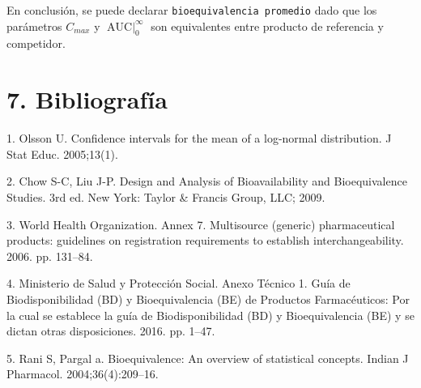 \documentclass[]{article}
\begin{document}
En conclusión, se puede declarar \texttt{bioequivalencia\ promedio} dado
que los parámetros \(C_{max}\) y \(\textrm{AUC}\mid_{0}^{\infty}\) son
equivalentes entre producto de referencia y competidor.

\section*{7. Bibliografía}\label{bibliografia}

\hypertarget{refs}{}
\hypertarget{ref-Olsson2005}{}
1. Olsson U. Confidence intervals for the mean of a log-normal
distribution. J Stat Educ. 2005;13(1).

\hypertarget{ref-Chow2009}{}
2. Chow S-C, Liu J-P. Design and Analysis of Bioavailability and
Bioequivalence Studies. 3rd ed. New York: Taylor \& Francis Group, LLC;
2009.

\hypertarget{ref-WorldHealthOrganization2006}{}
3. World Health Organization. Annex 7. Multisource (generic)
pharmaceutical products: guidelines on registration requirements to
establish interchangeability. 2006. pp. 131--84.

\hypertarget{ref-MinisteriodeSaludyProteccionSocial2016}{}
4. Ministerio de Salud y Protección Social. Anexo Técnico 1. Guía de
Biodisponibilidad (BD) y Bioequivalencia (BE) de Productos
Farmacéuticos: Por la cual se establece la guía de Biodisponibilidad
(BD) y Bioequivalencia (BE) y se dictan otras disposiciones. 2016. pp.
1--47.

\hypertarget{ref-Rani2004}{}
5. Rani S, Pargal a. Bioequivalence: An overview of statistical
concepts. Indian J Pharmacol. 2004;36(4):209--16.
\end{document}
